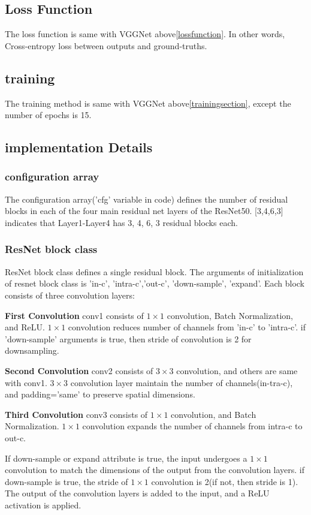 \documentclass[extendedabs]{bmvc2k}
\begin{document}
\subsection{Loss Function}
The loss function is same with VGGNet above\ref{lossfunction}. In other words, Cross-entropy loss between outputs and ground-truths.

\subsection{training}
The training method is same with VGGNet above\ref{trainingsection}, except the number of epochs is 15.

\subsection{implementation Details}
\subsubsection{configuration array}
The configuration array('cfg' variable in code) defines the number of residual blocks in each of the four main residual net layers of the ResNet50. [3,4,6,3] indicates that Layer1-Layer4 has 3, 4, 6, 3 residual blocks each.
\subsubsection{ResNet block class}
ResNet block class defines a single residual block. The arguments of initialization of resnet block class is 'in-c', 'intra-c','out-c', 'down-sample', 'expand'. Each block consists of three convolution layers:

\textbf{First Convolution} conv1 consists of $1\times1$ convolution, Batch Normalization, and ReLU. $1\times1$ convolution reduces number of channels from 'in-c' to 'intra-c'. if 'down-sample' arguments is true, then stride of convolution is 2 for downsampling.

\textbf{Second Convolution} conv2 consists of $3\times3$ convolution, and others are same with conv1. $3\times3$ convolution layer maintain the number of channels(in-tra-c), and padding='same' to preserve spatial dimensions.

\textbf{Third Convolution} conv3 consists of $1\times1$ convolution, and Batch Normalization. $1\times1$ convolution expands the number of channels from intra-c to out-c.

If down-sample or expand attribute is true, the input undergoes a $1\times1$ convolution to match the dimensions of the output from the convolution layers. if down-sample is true, the stride of $1\times1$ convolution is 2(if not, then stride is 1). The output of the convolution layers is added to the input, and a ReLU activation is applied.
\end{document}
